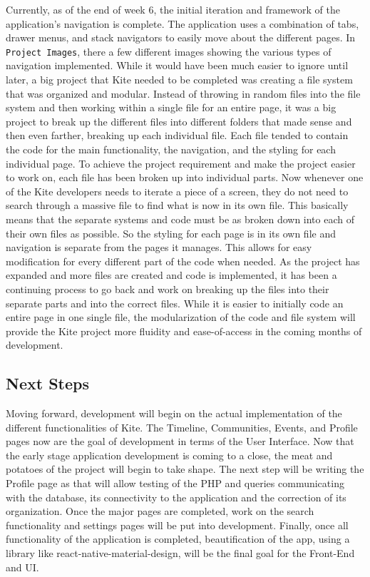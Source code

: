 \documentclass[compsoc, 10, draftclsnofoot, onecolumn]{IEEEtran}
\begin{document}
Currently, as of the end of week 6, the initial iteration  and framework of the application's navigation is complete. The application uses a combination of tabs, drawer menus, and stack navigators to easily move about the different pages. In \texttt{Project Images}, there a few different images showing the various types of navigation implemented. While it would have been much easier to ignore until later, a big project that Kite needed to be completed was creating a file system that was organized and modular. Instead of throwing in random files into the file system and then working within a single file for an entire page, it was a big project to break up the different files into different folders that made sense and then even farther, breaking up each individual file. Each file tended to contain the code for the main functionality, the navigation, and the styling for each individual page. To achieve the project requirement and make the project easier to work on, each file has been broken up into individual parts. Now whenever one of the Kite developers needs to iterate a piece of a screen, they do not need to search through a massive file to find what is now in its own file. This basically means that the separate systems and code must be as broken down into each of their own files as possible. So the styling for each page is in its own file and navigation is separate from the pages it manages. This allows for easy modification for every different part of the code when needed. As the project has expanded and more files are created and code is implemented, it has been a continuing process to go back and work on breaking up the files into their separate parts and into the correct files. While it is easier to initially code an entire page in one single file, the modularization of the code and file system will provide the Kite project more fluidity and ease-of-access in the coming months of development.

\subsection{Next Steps}
Moving forward, development will begin on the actual implementation of the different functionalities of Kite. The Timeline, Communities, Events, and Profile pages now are the goal of development in terms of the User Interface. Now that the early stage application development is coming to a close, the meat and potatoes of the project will begin to take shape. The next step will be writing the Profile page as that will allow testing of the PHP and queries communicating with the database, its connectivity to the application and the correction of its organization. Once the major pages are completed, work on the search functionality and settings pages will be put into development. Finally, once all functionality of the application is completed, beautification of the app, using a library like react-native-material-design, will be the final goal for the Front-End and UI.
\end{document}
